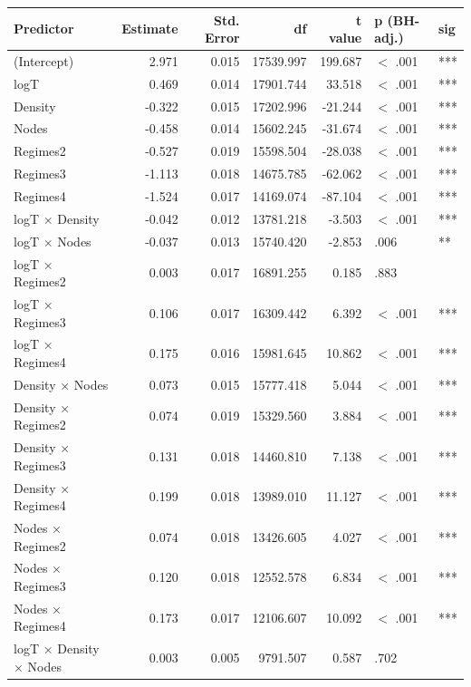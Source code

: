 \begin{table}[ht]
\centering
\begin{tabular}{lrrrrll}
  \hline
Predictor & Estimate & Std. Error & df & t value & p (BH-adj.) & sig \\ 
  \hline
(Intercept) & 2.971 & 0.015 & 17539.997 & 199.687 & $<$ .001 & *** \\ 
  logT & 0.469 & 0.014 & 17901.744 & 33.518 & $<$ .001 & *** \\ 
  Density & -0.322 & 0.015 & 17202.996 & -21.244 & $<$ .001 & *** \\ 
  Nodes & -0.458 & 0.014 & 15602.245 & -31.674 & $<$ .001 & *** \\ 
  Regimes2 & -0.527 & 0.019 & 15598.504 & -28.038 & $<$ .001 & *** \\ 
  Regimes3 & -1.113 & 0.018 & 14675.785 & -62.062 & $<$ .001 & *** \\ 
  Regimes4 & -1.524 & 0.017 & 14169.074 & -87.104 & $<$ .001 & *** \\ 
  logT × Density & -0.042 & 0.012 & 13781.218 & -3.503 & $<$ .001 & *** \\ 
  logT × Nodes & -0.037 & 0.013 & 15740.420 & -2.853 & .006 & ** \\ 
  logT × Regimes2 & 0.003 & 0.017 & 16891.255 & 0.185 & .883 &  \\ 
  logT × Regimes3 & 0.106 & 0.017 & 16309.442 & 6.392 & $<$ .001 & *** \\ 
  logT × Regimes4 & 0.175 & 0.016 & 15981.645 & 10.862 & $<$ .001 & *** \\ 
  Density × Nodes & 0.073 & 0.015 & 15777.418 & 5.044 & $<$ .001 & *** \\ 
  Density × Regimes2 & 0.074 & 0.019 & 15329.560 & 3.884 & $<$ .001 & *** \\ 
  Density × Regimes3 & 0.131 & 0.018 & 14460.810 & 7.138 & $<$ .001 & *** \\ 
  Density × Regimes4 & 0.199 & 0.018 & 13989.010 & 11.127 & $<$ .001 & *** \\ 
  Nodes × Regimes2 & 0.074 & 0.018 & 13426.605 & 4.027 & $<$ .001 & *** \\ 
  Nodes × Regimes3 & 0.120 & 0.018 & 12552.578 & 6.834 & $<$ .001 & *** \\ 
  Nodes × Regimes4 & 0.173 & 0.017 & 12106.607 & 10.092 & $<$ .001 & *** \\ 
  logT × Density × Nodes & 0.003 & 0.005 & 9791.507 & 0.587 & .702 &  \\ 

\end{tabular}
\end{table}
